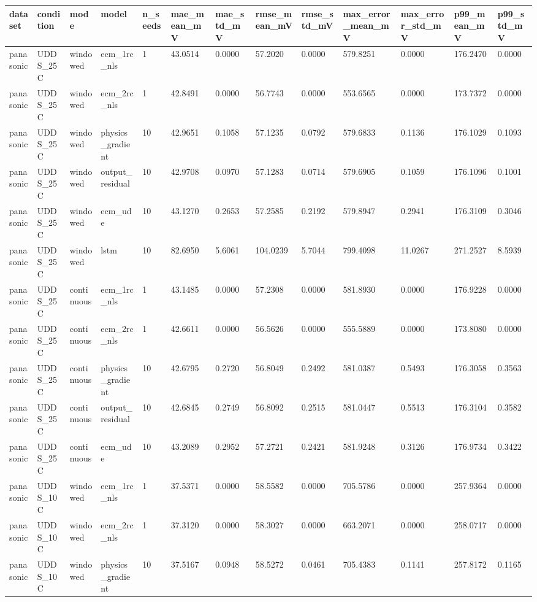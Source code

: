 \begin{tabular}{lllllllllllll}
\hline
dataset & condition & mode & model & n\_seeds & mae\_mean\_mV & mae\_std\_mV & rmse\_mean\_mV & rmse\_std\_mV & max\_error\_mean\_mV & max\_error\_std\_mV & p99\_mean\_mV & p99\_std\_mV \\
\hline
panasonic & UDDS\_25C & windowed & ecm\_1rc\_nls & 1 & 43.0514 & 0.0000 & 57.2020 & 0.0000 & 579.8251 & 0.0000 & 176.2470 & 0.0000 \\
panasonic & UDDS\_25C & windowed & ecm\_2rc\_nls & 1 & 42.8491 & 0.0000 & 56.7743 & 0.0000 & 553.6565 & 0.0000 & 173.7372 & 0.0000 \\
panasonic & UDDS\_25C & windowed & physics\_gradient & 10 & 42.9651 & 0.1058 & 57.1235 & 0.0792 & 579.6833 & 0.1136 & 176.1029 & 0.1093 \\
panasonic & UDDS\_25C & windowed & output\_residual & 10 & 42.9708 & 0.0970 & 57.1283 & 0.0714 & 579.6905 & 0.1059 & 176.1096 & 0.1001 \\
panasonic & UDDS\_25C & windowed & ecm\_ude & 10 & 43.1270 & 0.2653 & 57.2585 & 0.2192 & 579.8947 & 0.2941 & 176.3109 & 0.3046 \\
panasonic & UDDS\_25C & windowed & lstm & 10 & 82.6950 & 5.6061 & 104.0239 & 5.7044 & 799.4098 & 11.0267 & 271.2527 & 8.5939 \\
panasonic & UDDS\_25C & continuous & ecm\_1rc\_nls & 1 & 43.1485 & 0.0000 & 57.2308 & 0.0000 & 581.8930 & 0.0000 & 176.9228 & 0.0000 \\
panasonic & UDDS\_25C & continuous & ecm\_2rc\_nls & 1 & 42.6611 & 0.0000 & 56.5626 & 0.0000 & 555.5889 & 0.0000 & 173.8080 & 0.0000 \\
panasonic & UDDS\_25C & continuous & physics\_gradient & 10 & 42.6795 & 0.2720 & 56.8049 & 0.2492 & 581.0387 & 0.5493 & 176.3058 & 0.3563 \\
panasonic & UDDS\_25C & continuous & output\_residual & 10 & 42.6845 & 0.2749 & 56.8092 & 0.2515 & 581.0447 & 0.5513 & 176.3104 & 0.3582 \\
panasonic & UDDS\_25C & continuous & ecm\_ude & 10 & 43.2089 & 0.2952 & 57.2721 & 0.2421 & 581.9248 & 0.3126 & 176.9734 & 0.3422 \\
panasonic & UDDS\_10C & windowed & ecm\_1rc\_nls & 1 & 37.5371 & 0.0000 & 58.5582 & 0.0000 & 705.5786 & 0.0000 & 257.9364 & 0.0000 \\
panasonic & UDDS\_10C & windowed & ecm\_2rc\_nls & 1 & 37.3120 & 0.0000 & 58.3027 & 0.0000 & 663.2071 & 0.0000 & 258.0717 & 0.0000 \\
panasonic & UDDS\_10C & windowed & physics\_gradient & 10 & 37.5167 & 0.0948 & 58.5272 & 0.0461 & 705.4383 & 0.1141 & 257.8172 & 0.1165 \\

\end{tabular}
